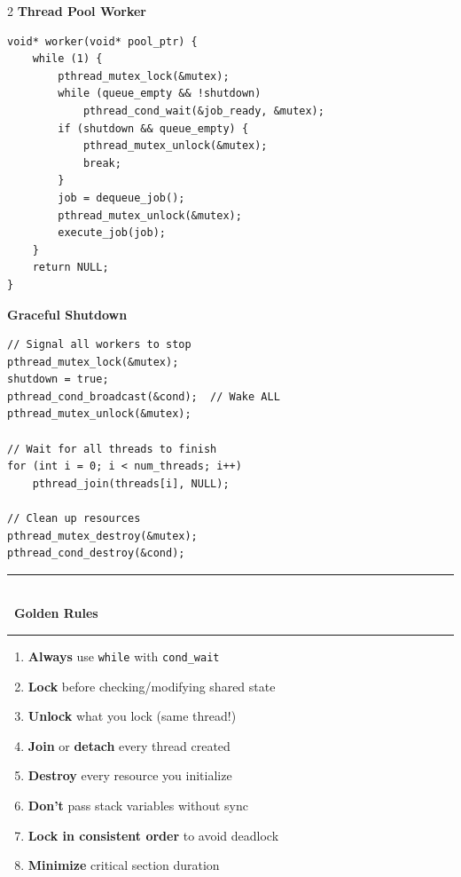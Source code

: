 \documentclass[11pt,a4paper]{article}
\newcommand{\styledSection}[2]{%
    \vspace{8pt}%
    \noindent\textcolor{primaryblue}{\rule{\linewidth}{1.5pt}}\\[-8pt]
    {\fontsize{14pt}{16pt}\selectfont\bfseries\color{primaryblue}#1\ #2}\\[-4pt]
    \textcolor{primaryblue!50}{\rule{\linewidth}{0.8pt}}%
    \vspace{4pt}%
}
\newcommand{\styledSubSection}[1]{%
    \vspace{4pt}%
    {\fontsize{11pt}{13pt}\selectfont\bfseries\color{secondaryblue}#1}%
    \vspace{2pt}%
}
\begin{document}
\begin{multicols}{2}
\styledSubSection{Thread Pool Worker}
\begin{lstlisting}
void* worker(void* pool_ptr) {
    while (1) {
        pthread_mutex_lock(&mutex);
        while (queue_empty && !shutdown)
            pthread_cond_wait(&job_ready, &mutex);
        if (shutdown && queue_empty) {
            pthread_mutex_unlock(&mutex);
            break;
        }
        job = dequeue_job();
        pthread_mutex_unlock(&mutex);
        execute_job(job);
    }
    return NULL;
}
\end{lstlisting}

\styledSubSection{Graceful Shutdown}
\begin{lstlisting}
// Signal all workers to stop
pthread_mutex_lock(&mutex);
shutdown = true;
pthread_cond_broadcast(&cond);  // Wake ALL
pthread_mutex_unlock(&mutex);

// Wait for all threads to finish
for (int i = 0; i < num_threads; i++)
    pthread_join(threads[i], NULL);

// Clean up resources
pthread_mutex_destroy(&mutex);
pthread_cond_destroy(&cond);
\end{lstlisting}

\styledSection{\faStar}{Golden Rules}

\begin{infobox}
\fontsize{9pt}{11pt}\selectfont
\begin{enumerate}[leftmargin=12pt, itemsep=1pt]
\item \textcolor{successgreen}{\textbf{Always}} use \texttt{while} with \texttt{cond\_wait}
\item \textcolor{successgreen}{\textbf{Lock}} before checking/modifying shared state
\item \textcolor{successgreen}{\textbf{Unlock}} what you lock (same thread!)
\item \textcolor{successgreen}{\textbf{Join}} or \textbf{detach} every thread created
\item \textcolor{successgreen}{\textbf{Destroy}} every resource you initialize
\item \textcolor{dangerred}{\textbf{Don't}} pass stack variables without sync
\item \textcolor{successgreen}{\textbf{Lock in consistent order}} to avoid deadlock
\item \textcolor{successgreen}{\textbf{Minimize}} critical section duration
\end{enumerate}
\end{infobox}


\end{multicols}
\end{document}
